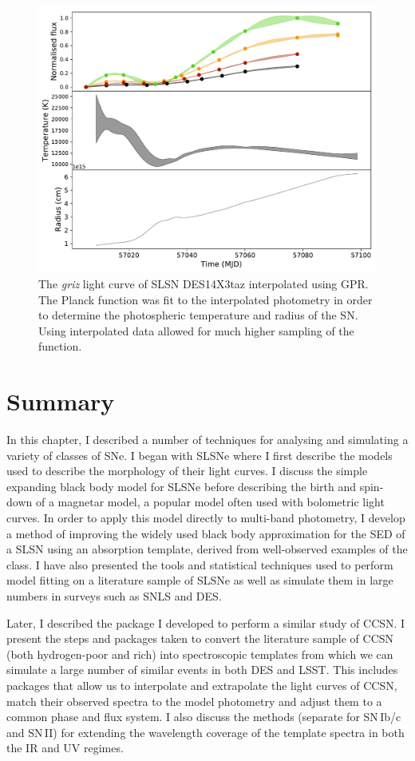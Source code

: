 \begin{figure}
  \centering
  \includegraphics[width=\textwidth]{Figures/Chapter4/GP_BB}
  \caption{The \textit{griz} light curve of SLSN DES14X3taz interpolated using GPR. The Planck function was fit to the interpolated photometry in order to determine the photospheric temperature and radius of the SN. Using interpolated data allowed for much higher sampling of the function.}
  \label{fig:GPBB}
\end{figure}

\section{Summary}
In this chapter, I described a number of techniques for analysing and simulating a variety of classes of SNe. I began with SLSNe where I first describe the models used to describe the morphology of their light curves. I discuss the simple expanding black body model for SLSNe before describing the birth and spin-down of a magnetar model, a popular model often used with bolometric light curves. In order to apply this model directly to multi-band photometry, I develop a method of improving the widely used black body approximation for the SED of a SLSN using an absorption template, derived from well-observed examples of the class. I have also presented the tools and statistical techniques used to perform model fitting on a literature sample of SLSNe as well as simulate them in large numbers in surveys such as SNLS and DES.

Later, I described the package I developed to perform a similar study of CCSN. I present the steps and packages taken to convert the literature sample of CCSN (both hydrogen-poor and rich) into spectroscopic templates from which we can simulate a large number of similar events in both DES and LSST. This includes packages that allow us to interpolate and extrapolate the light curves of CCSN, match their observed spectra to the model photometry and adjust them to a common phase and flux system. I also discuss the methods (separate for SN\,Ib/c and SN\,II) for extending the wavelength coverage of the template spectra in both the IR and UV regimes.

